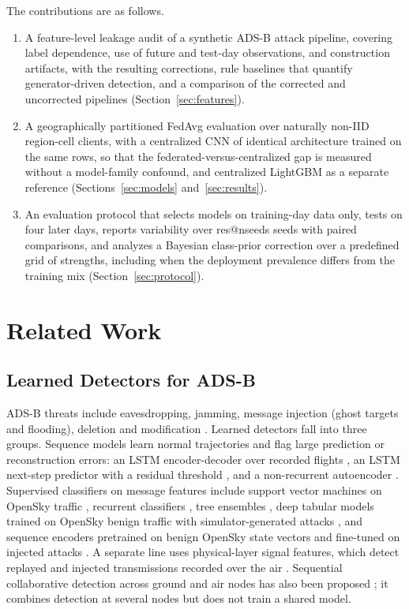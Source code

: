 \documentclass[conference]{IEEEtran}
\makeatletter
\providecommand{\R}[1]{\csname res@#1\endcsname}
\makeatother
\begin{document}
The contributions are as follows.
\begin{enumerate}
\item A feature-level leakage audit of a synthetic ADS-B attack pipeline, covering label dependence, use of future and test-day observations, and construction artifacts, with the resulting corrections, rule baselines that quantify generator-driven detection, and a comparison of the corrected and uncorrected pipelines (Section~\ref{sec:features}).
\item A geographically partitioned FedAvg evaluation over naturally non-IID region-cell clients, with a centralized CNN of identical architecture trained on the same rows, so that the federated-versus-centralized gap is measured without a model-family confound, and centralized LightGBM as a separate reference (Sections~\ref{sec:models} and~\ref{sec:results}).
\item An evaluation protocol that selects models on training-day data only, tests on four later days, reports variability over \R{nseeds} seeds with paired comparisons, and analyzes a Bayesian class-prior correction over a predefined grid of strengths, including when the deployment prevalence differs from the training mix (Section~\ref{sec:protocol}).
\end{enumerate}

\section{Related Work}\label{sec:related}

\subsection{Learned Detectors for ADS-B}
ADS-B threats include eavesdropping, jamming, message injection (ghost targets and flooding), deletion and modification \cite{strohmeier2015,schafer2013,ahmed2026survey}. Learned detectors fall into three groups. Sequence models learn normal trajectories and flag large prediction or reconstruction errors: an LSTM encoder-decoder over recorded flights \cite{habler2018}, an LSTM next-step predictor with a residual threshold \cite{wang2020}, and a non-recurrent autoencoder \cite{fried2021}. Supervised classifiers on message features include support vector machines on OpenSky traffic \cite{ouldslimane2022}, recurrent classifiers \cite{khoei2024}, tree ensembles \cite{cevik2025}, deep tabular models trained on OpenSky benign traffic with simulator-generated attacks \cite{ahmed2025}, and sequence encoders pretrained on benign OpenSky state vectors and fine-tuned on injected attacks \cite{ngamboe2025}. A separate line uses physical-layer signal features, which detect replayed and injected transmissions recorded over the air \cite{ying2019}. Sequential collaborative detection across ground and air nodes has also been proposed \cite{li2019ijcip}; it combines detection at several nodes but does not train a shared model.
\end{document}
